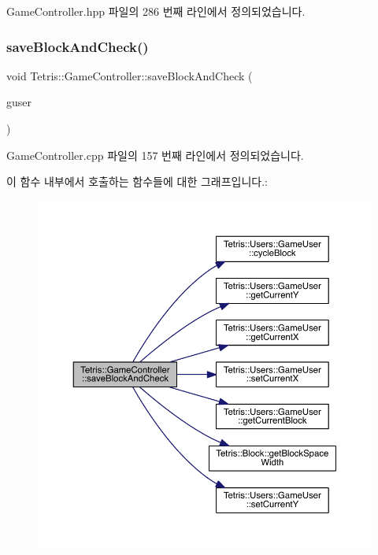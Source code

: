 Game\+Controller.\+hpp 파일의 286 번째 라인에서 정의되었습니다.

\mbox{\label{class_tetris_1_1_game_controller_a3c63a9754e4cbeae4f66a5760bb4055d}} 
\subsubsection{\texorpdfstring{save\+Block\+And\+Check()}{saveBlockAndCheck()}\hspace{0.1cm}{\footnotesize\ttfamily [1/2]}}
{\footnotesize\ttfamily void Tetris\+::\+Game\+Controller\+::save\+Block\+And\+Check (\begin{DoxyParamCaption}\item[{\hyperlink{class_tetris_1_1_users_1_1_game_user}{Users\+::\+Game\+User} $\ast$}]{guser }\end{DoxyParamCaption})}



Game\+Controller.\+cpp 파일의 157 번째 라인에서 정의되었습니다.

이 함수 내부에서 호출하는 함수들에 대한 그래프입니다.\+:
\nopagebreak
\begin{figure}[H]
\begin{center}
\leavevmode
\includegraphics[width=350pt]{class_tetris_1_1_game_controller_a3c63a9754e4cbeae4f66a5760bb4055d_cgraph}
\end{center}
\end{figure}
\mbox{\label{class_tetris_1_1_game_controller_a3c63a9754e4cbeae4f66a5760bb4055d}} 
